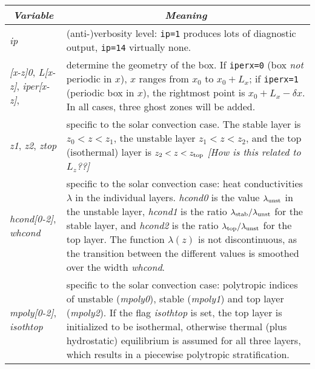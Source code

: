\documentclass[12pt,twoside,notitlepage,a4paper]{article}
\makeatletter
\newcommand{\Note}[1]{\emph{[#1]}}
\newcommand{\code}[1]{\texttt{#1}}
\newcommand{\var}[1]{\textsl{#1}\index{#1@\emph{#1}}\/}
\makeatother
\begin{document}
\begin{longtable}{lp{}}
\toprule
  \multicolumn{1}{c}{\emph{Variable}}
               & \multicolumn{1}{c}{\emph{Meaning}} \\
\midrule
  \var{ip}     & (anti-)verbosity level: \code{ip=1} produces lots of
                 diagnostic output, \code{ip=14} virtually none. \\
  \var{[x-z]0},
  \var{L[x-z]},
  \var{iper[x-z]},
               & determine the geometry of the box.
                 If \code{iperx=0} (box \emph{not\/} periodic in $x$), $x$
                 ranges from $x_0$ to $x_0+L_x$; if \code{iperx=1}
                 (periodic box in $x$), the rightmost point is
                 $x_0+L_x-\delta x$. In all cases, three ghost zones will
                 be added. \\
  \var{z1}, \var{z2}, \var{ztop}
               & specific to the solar convection case.
                 The stable layer is $z_0 < z < z_1$, the unstable layer
                 $z_1 < z < z_2$, and the top (isothermal) layer is
                 $z_2 < z < z_{\rm top}$
                 \Note{How is this related to $L_z$??} \\
  \var{hcond[0-2]}, \var{whcond}
               & specific to the solar convection case: heat conductivities
                 $\lambda$ in the individual layers. \var{hcond0} is the
                 value $\lambda_{\rm unst}$ in the unstable layer,
                 \var{hcond1} is the ratio
                 $\lambda_{\rm stab}/\lambda_{\rm unst}$ for the stable
                 layer, and \var{hcond2} is the ratio 
                 $\lambda_{\rm top}/\lambda_{\rm unst}$ for the top layer.
                 The function $\lambda(z)$ is not discontinuous, as the
                 transition between the different values is smoothed over
                 the width \var{whcond}. \\
  \var{mpoly[0-2]}, \var{isothtop}
               & specific to the solar convection case: polytropic indices
                 of unstable (\var{mpoly0}), stable (\var{mpoly1}) and top
                 layer (\var{mpoly2}).
                 If the flag \var{isothtop} is set, the
                 top layer is initialized to be isothermal, otherwise
                 thermal (plus hydrostatic) equilibrium is assumed for all
                 three layers, which results in a piecewise polytropic
                 stratification. \\

\end{longtable}
\end{document}
